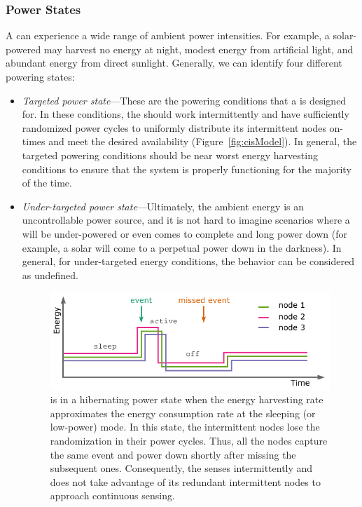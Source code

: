 \subsubsection{Power States}
\label{sec:power_state}
A \sys can experience a wide range of ambient power intensities. For example, a solar-powered \sys may harvest no energy at night, modest energy from artificial light, and abundant energy from direct sunlight.  Generally, we can identify four different \sys powering states: 
\begin{itemize}
		\item \textit{Targeted power state}---These are the powering conditions that a \sys is designed for. In these  conditions, the \sys should work intermittently and have sufficiently randomized power cycles to uniformly distribute its intermittent nodes on-times and meet the desired availability (Figure~\ref{fig:cisModel}). In general, the targeted powering conditions should be near worst energy harvesting conditions to ensure that the system is properly functioning for the majority of the time.
		\item \textit{Under-targeted power state}---Ultimately, the ambient energy is an uncontrollable power source, and it is not hard to imagine scenarios where a \sys will be under-powered or even comes to complete and long power down (for example, a solar \sys will come to a perpetual power down in the darkness). In general, for under-targeted energy conditions, the \sys behavior can be considered as undefined.
%
\begin{figure}
		\centering
		\includegraphics[width=\columnwidth]{figures/hibernating_power_state}
		\caption{\fullsys is in a hibernating power state when the energy harvesting rate approximates the energy consumption rate at the sleeping (or low-power) mode. In this state, the intermittent nodes lose the randomization in their power cycles. Thus, all the nodes capture the same event and power down shortly after missing the subsequent ones. Consequently, the \sys senses intermittently and does not take advantage of its redundant intermittent nodes to approach continuous sensing.}

\end{figure}
\end{itemize}
